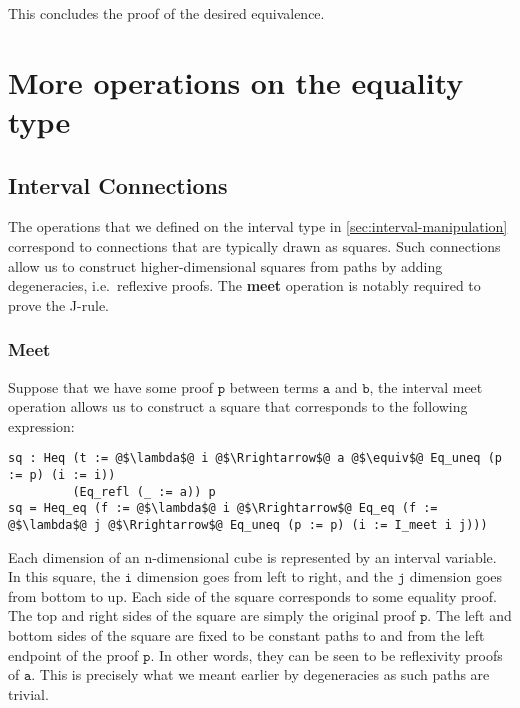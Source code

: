 \documentclass[12pt,twoside,maitrise]{dms}
\theoremstyle{definition}
\numberwithin{equation}{section}
\numberwithin{table}{chapter}
\numberwithin{figure}{chapter}
\newcommand\id[1] {\texttt{#1}}
\newcommand\fn[1] {\texttt{#1}}
\begin{document}
This concludes the proof of the desired equivalence.

\chapter{More operations on the equality type}\label{app:more-eq-ops}

\section*{Interval Connections}\label{sec:interval-connections}

The operations that we defined on the interval type in
\autoref{sec:interval-manipulation} correspond to
connections\cite{cohen2016cubical} that are typically drawn as squares. Such
connections allow us to construct higher-dimensional squares from paths by
adding degeneracies, i.e.\ reflexive proofs. The \textbf{meet} operation is
notably required to prove the J-rule.

\subsection*{Meet}

Suppose that we have some proof $\fn{p}$ between terms $\fn{a}$ and $\fn{b}$,
the interval meet operation allows us to construct a square that corresponds to
the following expression:

\begin{verbatim}
sq : Heq (t := @$\lambda$@ i @$\Rrightarrow$@ a @$\equiv$@ Eq_uneq (p := p) (i := i))
         (Eq_refl (_ := a)) p
sq = Heq_eq (f := @$\lambda$@ i @$\Rrightarrow$@ Eq_eq (f := @$\lambda$@ j @$\Rrightarrow$@ Eq_uneq (p := p) (i := I_meet i j)))
\end{verbatim}

Each dimension of an n-dimensional cube is represented by an interval variable.
In this square, the $\id{i}$ dimension goes from left to right, and the $\id{j}$
dimension goes from bottom to up. Each side of the square corresponds to some
equality proof. The top and right sides of the square are simply the original
proof $\id{p}$. The left and bottom sides of the square are fixed to be constant
paths to and from the left endpoint of the proof $\id{p}$. In other words, they
can be seen to be reflexivity proofs of $\id{a}$. This is precisely what we
meant earlier by degeneracies as such paths are trivial.
\end{document}
